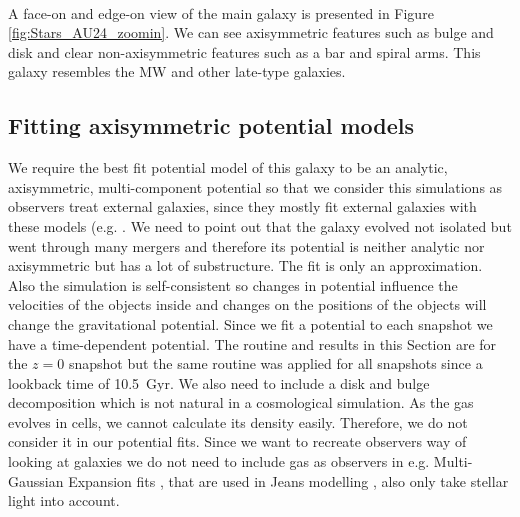 \\A face-on and edge-on view of the main galaxy is presented in Figure \ref{fig:Stars_AU24_zoomin}. We can see axisymmetric features such as bulge and disk and clear non-axisymmetric features such as a bar and spiral arms. This galaxy resembles the \ac{MW} and other late-type galaxies.
\subsection{Fitting axisymmetric potential models}\label{subsec:best_fit_pot}
We require the best fit potential model of this galaxy to be an analytic, axisymmetric, multi-component potential so that we consider this simulations as observers treat external galaxies, since they mostly fit external galaxies with these models (e.g. \citealp{Geehan...Andromedapot...2006}. We need to point out that the galaxy evolved not isolated but went through many mergers and therefore its potential is neither analytic nor axisymmetric but has a lot of substructure. The fit is only an approximation. Also the simulation is self-consistent so changes in potential influence the velocities of the objects inside and changes on the positions of the objects will change the gravitational potential. Since we fit a potential to each snapshot we have a time-dependent potential. The routine and results in this Section are for the $z=0$ snapshot but the same routine was applied for all snapshots since a lookback time of \SI{10.5}{Gyr}. We also need to include a disk and bulge decomposition which is not natural in a cosmological simulation. As the gas evolves in cells, we cannot calculate its density easily. Therefore, we do not consider it in our potential fits. Since we want to recreate observers way of looking at galaxies we do not need to include gas as observers in e.g. Multi-Gaussian Expansion fits \citep{MGE...Monnet, MGE...Emsellem}, that are used in Jeans modelling \citep{Cappellari...Jeans....2008, Glenn....einsteincross...2010}, also only take stellar light into account. 


